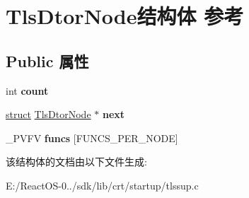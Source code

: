 \hypertarget{struct_tls_dtor_node}{}\section{Tls\+Dtor\+Node结构体 参考}
\label{struct_tls_dtor_node}
\subsection*{Public 属性}
\begin{DoxyCompactItemize}
\item 
\mbox{\label{struct_tls_dtor_node_a59117535e0ca3a7d25b2b66ffea848d0}} 
int {\bfseries count}
\item 
\mbox{\label{struct_tls_dtor_node_a5e193c732b612710a74c09ed6338f168}} 
\hyperlink{interfacestruct}{struct} \hyperlink{struct_tls_dtor_node}{Tls\+Dtor\+Node} $\ast$ {\bfseries next}
\item 
\mbox{\label{struct_tls_dtor_node_aadae514e48faa4628ffb43fa223e8e16}} 
\+\_\+\+P\+V\+FV {\bfseries funcs} \mbox{[}F\+U\+N\+C\+S\+\_\+\+P\+E\+R\+\_\+\+N\+O\+DE\mbox{]}
\end{DoxyCompactItemize}


该结构体的文档由以下文件生成\+:\begin{DoxyCompactItemize}
\item 
E\+:/\+React\+O\+S-\/0../sdk/lib/crt/startup/tlssup.\+c\end{DoxyCompactItemize}
